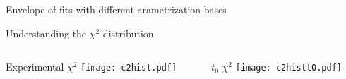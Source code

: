 \begin{frame}{Envelope of fits with different arametrization bases}
\end{frame}


\begin{frame}{Understanding the $\chi^2$ distribution}
    \begin{columns}
        \begin{column}[T]{0.48\textwidth}
            \centering
            Experimental $\chi^2$
            \texttt{[image: c2hist.pdf]}
        \end{column}
        \begin{column}[T]{0.48\textwidth}
            \centering
            $t_0$ $\chi^2$
            \texttt{[image: c2histt0.pdf]}
        \end{column}
    \end{columns}
\end{frame}


